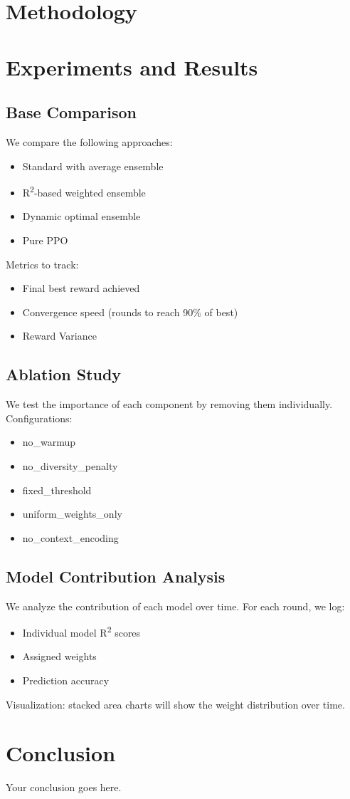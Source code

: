 \documentclass[conference]{IEEEtran}
\begin{document}
\section{Methodology}




\section{Experiments and Results}

\subsection{Base Comparison}
We compare the following approaches:
\begin{itemize}
    \item Standard with average ensemble
    \item R\textsuperscript{2}-based weighted ensemble
    \item Dynamic optimal ensemble
    \item Pure PPO
\end{itemize}

Metrics to track:
\begin{itemize}
    \item Final best reward achieved
    \item Convergence speed (rounds to reach 90\% of best)
    \item Reward Variance
\end{itemize}

\subsection{Ablation Study}
We test the importance of each component by removing them individually.  
Configurations:
\begin{itemize}
    \item no\_warmup
    \item no\_diversity\_penalty
    \item fixed\_threshold
    \item uniform\_weights\_only
    \item no\_context\_encoding
\end{itemize}



\subsection{Model Contribution Analysis}
We analyze the contribution of each model over time.  
For each round, we log:
\begin{itemize}
    \item Individual model R\textsuperscript{2} scores
    \item Assigned weights
    \item Prediction accuracy
\end{itemize}

Visualization: stacked area charts will show the weight distribution over time.






\section{Conclusion}
Your conclusion goes here.


\end{document}
